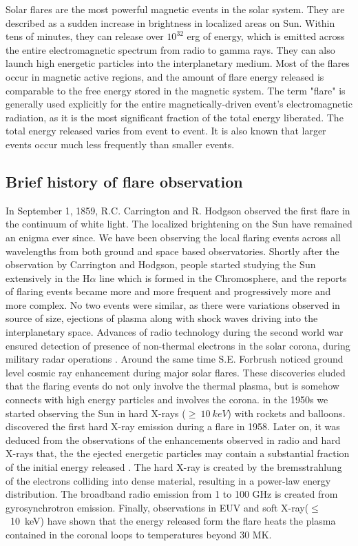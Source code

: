 Solar flares are the most powerful magnetic events in the solar system. They are described as a sudden increase in brightness in localized areas on Sun. Within tens of minutes, they can release over $10^{32}$ erg of energy, which is emitted across the entire electromagnetic spectrum from radio to gamma rays. They can also launch high energetic particles into the interplanetary medium. Most of the flares occur in magnetic active regions, and the amount of flare energy released is comparable to the free energy stored in the magnetic system. The term "flare" is generally used explicitly for the entire magnetically-driven event's electromagnetic radiation, as it is the most significant fraction of the total energy liberated. The total energy released varies from event to event. It is also known that larger events occur much less frequently than smaller events.

\subsection{Brief history of flare observation}\label{sol_flr_1}

In September 1, 1859, R.C. Carrington and R. Hodgson observed the first flare in the continuum of white light\citep{carrington1859,hodgson1859}. The localized brightening on the Sun have remained an enigma ever since. We have been observing the local flaring events across all wavelengths from both ground and space based observatories.  Shortly after the observation by Carrington and Hodgson, people started studying the Sun extensively in the H$\alpha$ line which is formed in the Chromosphere, and the reports of flaring events became more and more frequent and progressively more and more complex. No two events were similar, as there were variations observed in source of size, ejections of plasma along with shock waves driving into the interplanetary space. Advances of radio technology during the second world war ensured detection of presence of non-thermal electrons in the solar corona, during military radar operations \citep{hey46}. Around the same time S.E. Forbrush noticed ground level cosmic ray enhancement during major solar flares. These discoveries eluded that the flaring events do not only involve the thermal plasma, but is somehow connects with high energy particles and involves the corona. in the 1950s we started observing the Sun in hard X-rays ($\ge~10~keV$) with rockets and balloons. \cite{peterson59} discovered the first hard X-ray emission during a flare in 1958. Later on, it was deduced from the observations of the enhancements observed in radio and hard X-rays that, the the ejected energetic particles may contain a substantial fraction of the initial energy released \citep{brown71}. The hard X-ray is created by the bremsstrahlung of the electrons colliding into dense material, resulting in a power-law energy distribution. The broadband radio emission from 1 to 100 GHz is created from gyrosynchrotron emission. Finally, observations in EUV and soft X-ray($\le$~10~keV) have shown that the energy released form the flare heats the plasma contained in the coronal loops to temperatures beyond 30 MK. 

